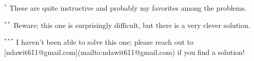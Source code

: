 $^*$ These are quite instructive and probably my favorites among the problems.

$^{**}$ Beware; this one is surprisingly difficult, but there is a very clever solution.

$^{***}$ I haven't been able to solve this one; please reach out to [ndawit611@gmail.com](mailto:ndawit611@gmail.com) if you find a solution!
